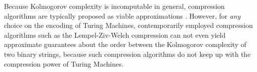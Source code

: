 
Because Kolmogorov complexity is incomputable in general, compression algorithms are typically proposed as viable approximations \cite{cilibrasi2005clustering}. 
However, for \textit{any} choice on the encoding of Turing Machines, contemporarily employed compression algorithms such as the Lempel-Ziv-Welch compression can not even yield approximate guarantees about the order between the Kolmogorov complexity of two binary strings, because such compression algorithms do not keep up with the compression power of Turing Machines.


